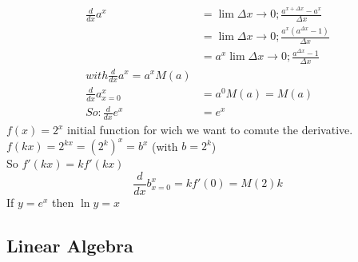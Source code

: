\documentclass{article}
\begin{document}
            \begin{align*}
                \frac{d}{dx} a^x &= \lim {\Delta x \to 0} ; \frac{a^{x+\Delta x} - a^x}{\Delta x}\\
                &= \lim {\Delta x \to 0} ; \frac{a^x (a^{\Delta x} -1)}{\Delta x}\\
                &= a^x \lim {\Delta x \to 0} ; \frac{a^{\Delta x} -1}{\Delta x}\\
                with \frac{d}{dx} a^x = a^x M(a)\\
                \frac{d}{dx}a^x_{x=0} &= a^0 M(a) = M(a)\\
                So :
                \frac{d}{dx} e^x &= e^x
            \end{align*}
            $f(x) = 2^x$ initial function for wich we want to comute the derivative.\\
            $f(kx) = 2^{kx} = (2^k)^x = b^x$ (with $b=2^k$)\\
            So $f'(kx) = kf'(kx)$
            \[ \frac{d}{dx}b^x_{x=0} = kf'(0) = M(2)k \]
            If $y=e^x$ then $\ln y = x$

        \subsection{Linear Algebra}
\end{document}

